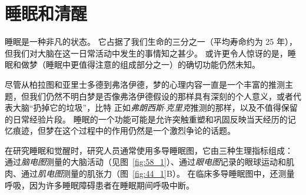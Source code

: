 \chapter{睡眠和清醒} \label{chap:chap44}

睡眠是一种非凡的状态。
它占据了我们生命的三分之一（平均寿命约为 25 年），但我们对大脑在这一日常活动中发生的事情知之甚少。
或许更令人惊讶的是，睡眠和做梦（睡眠中更值得注意的组成部分之一）的确切功能仍然未知。


尽管从柏拉图和亚里士多德到弗洛伊德，梦的心理内容一直是一个丰富的推测主题，但我们仍然不明白梦是否像弗洛伊德假设的那样具有深刻的个人意义，或者代表大脑“扔掉它的垃圾”，比特 正如\textit{弗朗西斯$\cdot$克里克}推测的那样，以及不值得保留的日常经验片段。
睡眠的一个功能可能是允许突触重塑和巩固反映当天经历的记忆痕迹，但梦在这个过程中的作用仍然是一个激烈争论的话题。


在研究睡眠和觉醒时，研究人员通常使用多导睡眠图，它由三种生理指标组成：
通过\textit{脑电图}测量的大脑活动（见图~\ref{fig:58_1}）、通过\textit{眼电图}记录的眼球运动和肌肉、通过\textit{肌电图}测量的肌张力（图~\ref{fig:44_1}B）。
在临床多导睡眠图中，还测量呼吸，因为许多睡眠障碍患者在睡眠期间呼吸中断。


